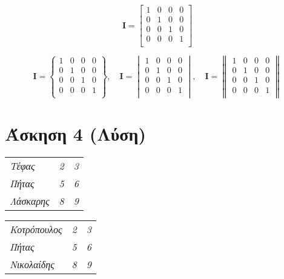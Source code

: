 \documentclass[a4paper,11pt]{article}
\begin{document}
	\quad
	
	\begin{equation}
	\textbf{I} = 
	\begin{bmatrix}
	1&0&0&0 \\
	0&1&0&0 \\
	0&0&1&0 \\
	0&0&0&1 \\
	\end{bmatrix}
	\end{equation}
	
	\quad
	
	\begin{equation}
	\textbf{I} =
	\begin{Bmatrix} 
	1&0&0&0 \\
	0&1&0&0 \\
	0&0&1&0 \\
	0&0&0&1 \\
	\end{Bmatrix},\quad
	\textbf{I} =
	\begin{vmatrix} 
	1&0&0&0 \\
	0&1&0&0 \\
	0&0&1&0 \\
	0&0&0&1 \\
	\end{vmatrix},\quad
	\textbf{I} =
	\begin{Vmatrix} 
	1&0&0&0 \\
	0&1&0&0 \\
	0&0&1&0 \\
	0&0&0&1 \\
	\end{Vmatrix}
	\end{equation}

\vspace{20pt}

\section{Άσκηση 4 (Λύση)}
		
	\begin{table}[!h]
	\centering
	\begin{tabular}{ >{\em}l >{\em}c >{\em}c }
	Τέφας & 2 & 3 \\ 
	Πήτας & 5 & 6 \\ 
	Λάσκαρης & 8 & 9 \\ 
	\end{tabular}
	\end{table}	

	\begin{table}[!h]
	\centering
	\begin{tabular}{ | >{\em}l | >{\em}c | >{\em}c | }
	Κοτρόπουλος & 2 & 3 \\
	Πήτας & 5 & 6 \\ 
	Νικολαίδης & 8 & 9 \\ 
	\end{tabular}
	\end{table}		
	
\end{document}
